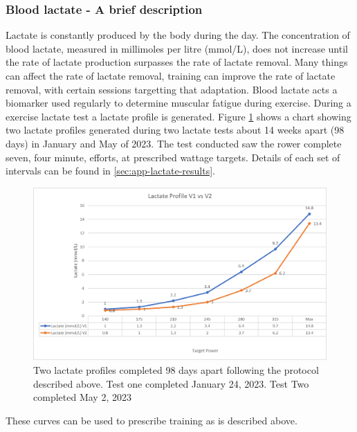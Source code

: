 \subsubsection{Blood lactate - A brief description}
Lactate is constantly produced by the body during the day. The concentration of blood lactate, measured in millimoles per litre (mmol/L), does not increase until the rate of lactate production surpasses the rate of lactate removal. Many things can affect the rate of lactate removal, training can improve the rate of lactate removal, with certain sessions targetting that adaptation. Blood lactate acts a biomarker used regularly to determine muscular fatigue during exercise. During a exercise lactate test a lactate profile is generated. Figure \ref{fig:lactateGraph} shows a chart showing two lactate profiles generated during two lactate tests about 14 weeks apart (98 days) in January and May of 2023. The test conducted saw the rower complete seven, four minute, efforts, at prescribed wattage targets. Details of each set of intervals can be found in \ref{sec:app-lactate-results}.
\begin{figure}
  \centering
  \includegraphics[width=\linewidth]{figures/lactateGraph.png}
  \caption[Lactate Profiles from January and May 2023]{Two lactate profiles completed 98 days apart following the protocol described above. Test one completed January 24, 2023. Test Two completed May 2, 2023}
  \label{fig:lactateGraph}
\end{figure}
These curves can be used to prescribe training as is described above.

